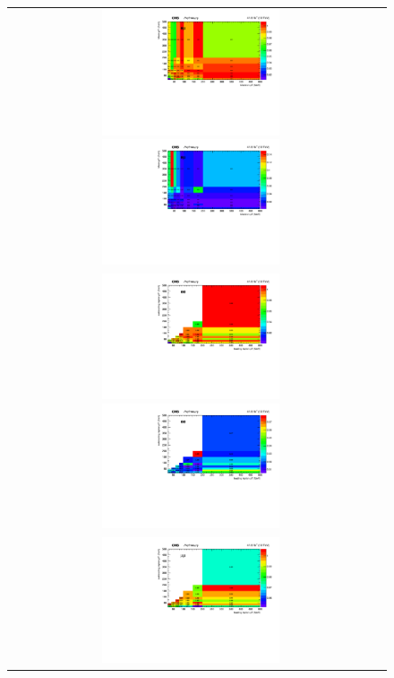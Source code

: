 {\begin{figure}[h]
  \begin{center}
    \begin{tabular}{cc}
      \includegraphics[width=0.50\textwidth]{fig_2017_TrigSF/h2D_lepABpt_emu.pdf}
      \includegraphics[width=0.50\textwidth]{fig_2017_TrigSF/h2D_lepABpt_emu_BinErrors.pdf}\\       
      \includegraphics[width=0.50\textwidth]{fig_2017_TrigSF/h2D_lepABpt_ee.pdf}
      \includegraphics[width=0.50\textwidth]{fig_2017_TrigSF/h2D_lepABpt_ee_BinErrors.pdf}\\
      \includegraphics[width=0.50\textwidth]{fig_2017_TrigSF/h2D_lepABpt_mumu.pdf}

\end{tabular}
\end{center}
\end{figure}}
